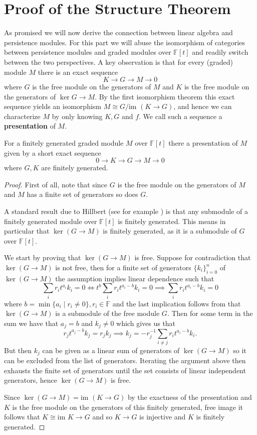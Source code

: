 \section{Proof of the Structure Theorem}
As promised we will now derive the connection between linear algebra and persistence modules. For this part we will abuse the isomorphism of categories between persistence modules and graded modules over $\mathbb{F}[t]$ and readily switch between the two perspectives.  A key observation is that for every (graded) module $M$ there is an exact sequence
\[ K \to G \to M \to 0\]
where $G$ is the free module on the generators of $M$ and $K$ is the free module on the generators of $\ker G \to M$. By the first isomorphism theorem this exact sequence yields an isomorphism $M \cong G/\text{im }(K \to G)$, and hence we can characterize $M$ by only knowing $K,G$ and $f$. We call such a sequence a \textbf{presentation} of $M$.
\begin{lemma}
  For a finitely generated graded module $M$ over $\mathbb{F}[t]$ there a presentation of $M$ given by a short exact sequence
  \[ 0 \to K \to G \to M \to 0\]
  where $G,K$ are finitely generated.
\end{lemma}
\begin{proof}
First of all, note that since $G$ is the free module on the generators of $M$ and $M$ has a finite set of generators so does $G$.

A standard result due to Hillbert (see for example \cite[Theorem 4, p. ~76]{Cox+Others/1991/Ideals}) is that any submodule of a finitely generated module over $\mathbb{F}[t]$ is finitely generated. This means in particular that $\ker (G \to M)$ is finitely generated, as it is a submodule of $G$ over $\mathbb{F}[t]$.

We start by proving that $\ker (G \to M)$ is free. Suppose for contradiction that $\ker (G \to M)$ is not free, then for a finite set of generators $\{k_{i}\}^{n}_{i=0}$ of $\ker (G \to M)$ the assumption implies linear dependence such that
\[\sum_{i} r_{i}t^{a_{i}}k_{i}=0  \iff t^{b} \sum_{i} r_{i}t^{a_{i}-b}k_{i} = 0 \implies \sum_{i} r_{i}t^{a_{i}-b}k_{i} = 0 \]
where $b = \min\{a_{i} \mid r_{i} \neq 0\}, r_{i} \in \mathbb{F}$ and the last implication follows from that $\ker(G \to M)$ is a submodule of the free module $G$. Then for some term in the sum we have that $a_{j}=b$ and $ k_{j} \neq 0 $ which gives us that
\[
  r_{j}t^{a_{j}-b}k_{j}=r_{j}k_{j} \implies k_{j} = - r_{j}^{-1}\sum_{i \neq j} r_{i}t^{a_{i}-b}k_{i}.
\]
But then $k_{j}$ can be given as a linear sum of generators of $\ker (G \to M)$ so it can be excluded from the list of generators. Iterating the argument above then exhausts the finite set of generators until the set consists of linear independent generators, hence $\ker (G \to M)$ is free.

Since $\ker (G \to M) = \text{im } (K \to G)$ by the exactness of the presentation and $K$ is the free module on the generators of this finitely generated, free image it follows that $K \cong \text{im } K \to G$ and so $K \to G$ is injective and $K$ is finitely generated.
\end{proof}
